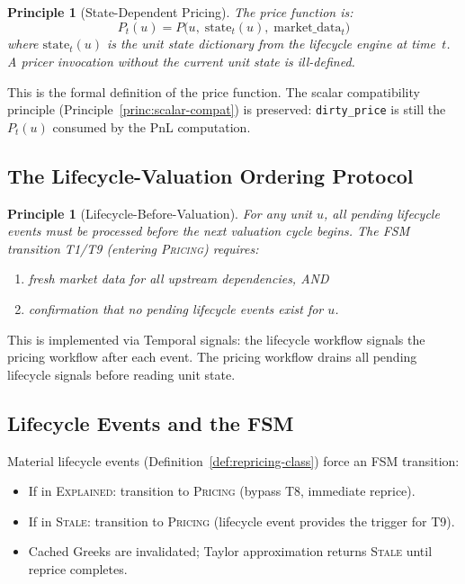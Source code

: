 \documentclass[11pt,a4paper]{article}
\newtheorem{principle}[definition]{Principle}
\begin{document}
\begin{principle}[State-Dependent Pricing]
\label{princ:state-dep-pricing}
The price function is:
\begin{equation}\label{eq:price-func}
\boxed{P_t(u) = P\bigl(u,\; \mathrm{state}_t(u),\; \mathrm{market\_data}_t\bigr)}
\end{equation}
where $\mathrm{state}_t(u)$ is the unit state dictionary from the lifecycle engine at time~$t$.  A pricer invocation without the current unit state is ill-defined.
\end{principle}

\noindent This is the formal definition of the price function.  The scalar compatibility principle (Principle~\ref{princ:scalar-compat}) is preserved: \texttt{dirty\_price} is still the $P_t(u)$ consumed by the PnL computation.

\subsection{The Lifecycle-Valuation Ordering Protocol}

\begin{principle}[Lifecycle-Before-Valuation]
\label{princ:lifecycle-before-val}
For any unit $u$, all pending lifecycle events must be processed before the next valuation cycle begins.  The FSM transition T1/T9 (entering \textsc{Pricing}) requires:
\begin{enumerate}[nosep]
\item[(a)] fresh market data for all upstream dependencies, AND
\item[(b)] confirmation that no pending lifecycle events exist for $u$.
\end{enumerate}
\end{principle}

This is implemented via Temporal signals: the lifecycle workflow signals the pricing workflow after each event.  The pricing workflow drains all pending lifecycle signals before reading unit state.

\subsection{Lifecycle Events and the FSM}

Material lifecycle events (Definition~\ref{def:repricing-class}) force an FSM transition:
\begin{itemize}[nosep]
\item If in \textsc{Explained}: transition to \textsc{Pricing} (bypass T8, immediate reprice).
\item If in \textsc{Stale}: transition to \textsc{Pricing} (lifecycle event provides the trigger for T9).
\item Cached Greeks are invalidated; Taylor approximation returns \textsc{Stale} until reprice completes.
\end{itemize}
\end{document}

